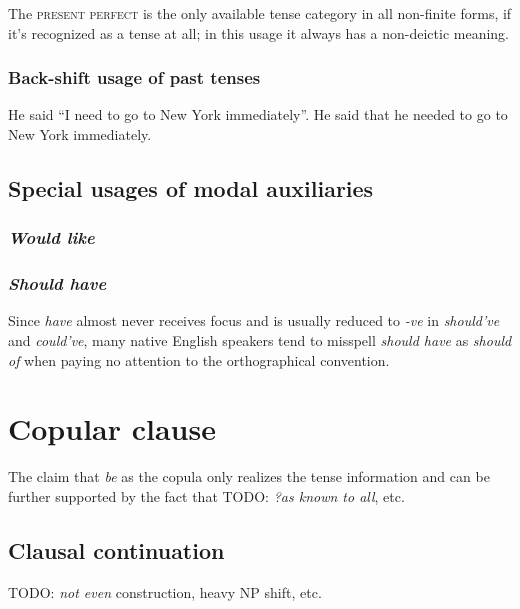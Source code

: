 \documentclass[UTF8, a4paper, oneside, scheme=plain, 12pt]{ctexbook}
\newcommand{\form}[1]{\emph{#1}}
\newcommand{\category}[1]{\textsc{#1}}
\begin{document}
The \category{present perfect} is the only available tense category
in all non-finite forms, 
if it's recognized as a tense at all;
in this usage it always has a non-deictic meaning. 

\subsubsection{Back-shift usage of past tenses}

\begin{exe}
    \ex \begin{xlist}
        \ex He said ``I need to go to New York immediately''.
        \ex He said that he needed to go to New York immediately.
    \end{xlist}
\end{exe}

\subsection{Special usages of modal auxiliaries}\label{sec:verb-inflection.modal-use}

\subsubsection{\form{Would like}}

\subsubsection{\form{Should have}}

Since \form{have} almost never receives focus
and is usually reduced to \form{-ve} in \form{should've} and \form{could've},
many native English speakers 
tend to misspell \form{should have} as \form{should of}
when paying no attention to the orthographical convention.

\section{Copular clause}

The claim that \form{be} as the copula only realizes the tense information 
and can be further supported by the fact 
that TODO: \form{?as known to all}, etc.

\subsection{Clausal continuation}

TODO: \form{not even} construction, heavy NP shift, etc.
\end{document}
